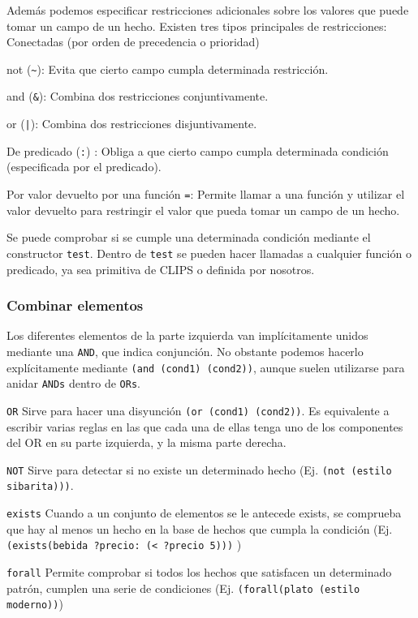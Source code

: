 \documentclass[11pt,svgnames]{scrbook}
\begin{document}
Además podemos especificar restricciones adicionales sobre los valores que puede
tomar un campo de un hecho. Existen tres tipos principales de restricciones: 
Conectadas (por orden de precedencia o prioridad) 
\begin{description}
 \item not (\verb|~|):
  Evita que cierto campo cumpla determinada restricción. 
\item and (\verb|&|): Combina dos restricciones conjuntivamente. 
\item or (\verb+|+): Combina dos restricciones disjuntivamente. 
\item De predicado (\verb|:|) : Obliga a que cierto campo cumpla determinada
condición (especificada por el predicado). 
\item Por valor devuelto por una función \verb|=|: Permite llamar a una función
y utilizar el valor devuelto para restringir el valor que pueda tomar un campo
de un hecho. 

Se puede comprobar si se cumple una determinada condición mediante el
constructor
\texttt{test}. Dentro de \texttt{test} se pueden hacer llamadas a cualquier
función o predicado, ya
sea primitiva de CLIPS o definida por nosotros.
\end{description}

\subsubsection*{Combinar elementos}


Los diferentes elementos de la parte izquierda van
implícitamente unidos mediante una \texttt{AND}, que indica conjunción. No
obstante podemos hacerlo explícitamente mediante \texttt{(and (cond1) (cond2))},
aunque suelen utilizarse para anidar \texttt{ANDs} dentro de \texttt{ORs}.

\texttt{OR} Sirve para hacer una disyunción \texttt{(or (cond1) (cond2))}. Es
equivalente a escribir varias reglas en las que cada una de ellas tenga uno de
los componentes del OR en su parte izquierda, y la misma parte derecha.

\texttt{NOT} Sirve para detectar si no existe un determinado hecho (Ej. 
\texttt{(not (estilo sibarita)))}. 

\texttt{exists} Cuando a un conjunto de elementos se le antecede exists, se
comprueba que hay al menos un hecho en la base de hechos que cumpla la condición
(Ej. \texttt{(exists(bebida ?precio: (< ?precio 5)))} )

\texttt{forall} Permite comprobar si todos los hechos que satisfacen un
determinado patrón, cumplen una serie de condiciones (Ej. \texttt{(forall(plato
(estilo moderno))})
\end{document}
